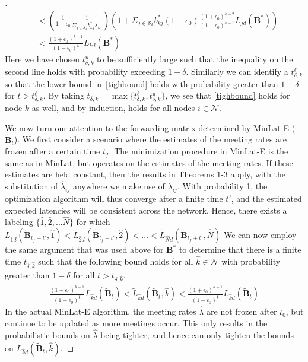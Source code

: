 \documentclass[journal,onecolumn,11pt]{IEEEtran}
\theoremstyle{plain}
\theoremstyle{definition}
\begin{document}
\begin{proof}[\unskip\nopunct]
\begin{subequations}
\begin{align}
&<(\frac{1}{1-\epsilon_0}\frac{1}{\Sigma_{j\in \mathcal{S}_k}b_{kj}^*\lambda_{kj}})
(1+\Sigma_{j\in \mathcal{S}_k}b_{kj}^*(1+\epsilon_0)\frac{(1+\epsilon_0)^{k-2}}{(1-\epsilon_0)^{k-1}}L_{jd}(\mathbf{B}^*))\\
&<\frac{(1+\epsilon_0)^{k-1}}{(1-\epsilon_0)^{k}} L_{kd}(\mathbf{B}^*)
\end{align}
\end{subequations}
Here we have chosen $t^u_{\delta,k}$ to be sufficiently large such
that the inequality on the second line holds with probability
exceeding $1-\delta$.  Similarly we can identify a $t^\ell_{\delta,k}$
so that the lower bound in~\eqref{tighbound} holds with probability
greater than $1-\delta$ for $t>t^\ell_{\delta,k}$.  By taking
$t_{\delta,k} = \max\{t^\ell_{\delta,k},t^u_{\delta,k} \}$, we see
that \eqref{tighbound} holds for node $k$ as well, and by induction,
holds for all nodes $i \in \mathcal{N}$.

We now turn our attention to the forwarding matrix determined by
MinLat-E ($\widetilde{\mathbf{B}}_t$).  We first consider a scenario where the estimates of
the meeting rates are frozen after a certain time $t_f$. The
minimization procedure in MinLat-E is the same as in MinLat, but
operates on the estimates of the meeting rates. If these estimates are
held constant, then the results in Theorems 1-3 apply, with the
substitution of $\widehat{\lambda}_{ij}$ anywhere we make use of
$\lambda_{ij}$. With probability 1, the optimization algorithm will
thus converge after a finite time $t'$, and the estimated expected
latencies will be consistent across the network. Hence, there exists a
labeling $\{\hat{1},\hat{2},...\hat{N}\}$ for which
$\widetilde{L}_{\hat{1}d}(\widetilde{\mathbf{B}}_{t_f+t'},\hat{1}) <
\widetilde{L}_{\hat{2}d}(\widetilde{\mathbf{B}}_{t_f+t'},\hat{2}) <
\dots <
\widetilde{L}_{\hat{N}d}(\widetilde{\mathbf{B}}_{t_f+t'},\hat{N})$ We
can now employ the same argument that was used above for
$\mathbf{B}^*$ to determine that there is a finite time $t_{\delta,\hat{k}}$ such
that the following bound holds for all $\hat{k} \in \mathcal{N}$ with probability greater than
$1-\delta$ for all $t>t_{\delta,\hat{k}}$. 
\begin{equation}\label{lhat}
\begin{aligned}
\frac{(1-\epsilon_0)^{\hat{k}-1}}{(1+\epsilon_0)^{\hat{k}}} L_{\hat{k}d}(\widetilde{\mathbf{B}}_{t})<\widetilde{L}_{\hat{k}d}(\widetilde{\mathbf{B}}_{t},\hat{k})<\frac{(1+\epsilon_0)^{\hat{k}-1}}{(1-\epsilon_0)^{\hat{k}}} L_{\hat{k}d}(\widetilde{\mathbf{B}}_{t})
\end{aligned}
\end{equation}
In the actual MinLat-E algorithm, the meeting rates
$\widehat{\lambda}$ are not frozen after $t_0$, but continue to be
updated as more meetings occur. This only results in the probabilistic
bounds on $\widehat{\lambda}$ being tighter, and hence can only
tighten the bounds on ${L}_{\hat{k}d}(\widetilde{\mathbf{B}}_{t},\hat{k})$.


\end{proof}
\end{document}
